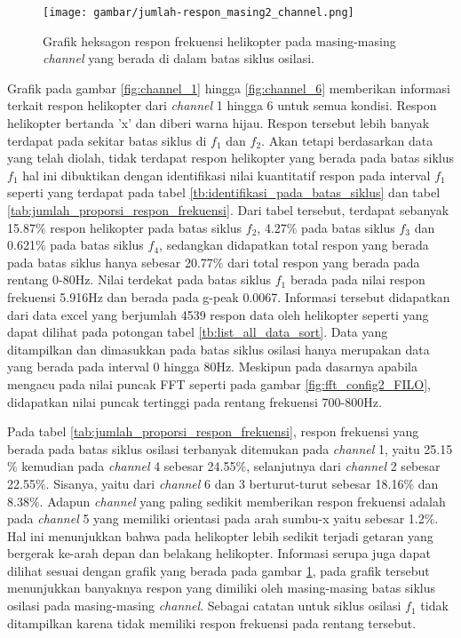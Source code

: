 \begin{figure}[H]
	\centering
	\texttt{[image: gambar/jumlah-respon\_masing2\_channel.png]}
	\caption{Grafik heksagon respon frekuensi helikopter pada masing-masing \textit{channel} yang berada di dalam batas siklus osilasi.}
	\label{fig:grafik_heksagon}
\end{figure}

Grafik pada gambar \ref{fig:channel_1} hingga \ref{fig:channel_6} memberikan informasi terkait respon helikopter dari \textit{channel} 1 hingga 6 untuk semua kondisi. Respon helikopter bertanda 'x' dan diberi warna hijau. Respon tersebut lebih banyak terdapat pada sekitar batas siklus di $f_1$ dan $f_2$. Akan tetapi berdasarkan data yang telah diolah, tidak terdapat respon helikopter yang berada pada batas siklus $f_1$ hal ini dibuktikan dengan identifikasi nilai kuantitatif respon pada interval $f_1$ seperti yang terdapat pada tabel \ref{tb:identifikasi_pada_batas_siklus} dan tabel \ref{tab:jumlah_proporsi_respon_frekuensi}. Dari tabel tersebut, terdapat sebanyak 15.87$\%$ respon helikopter pada batas siklus $f_2$, 4.27$\%$ pada batas siklus $f_3$ dan 0.621$\%$ pada batas siklus $f_4$, sedangkan didapatkan total respon yang berada pada batas siklus hanya sebesar 20.77$\%$ dari total respon yang berada pada rentang 0-80Hz. Nilai terdekat pada batas siklus $f_1$ berada pada nilai respon frekuensi 5.916Hz dan berada pada g-peak 0.0067. Informasi tersebut didapatkan dari data excel yang berjumlah 4539 respon data oleh helikopter seperti yang dapat dilihat pada potongan tabel \ref{tb:list_all_data_sort}. Data yang ditampilkan dan dimasukkan pada batas siklus osilasi hanya merupakan data yang berada pada interval 0 hingga 80Hz. Meskipun pada dasarnya apabila mengacu pada nilai puncak FFT seperti pada gambar \ref{fig:fft_config2_FILO}, didapatkan nilai puncak tertinggi pada rentang frekuensi 700-800Hz.

Pada tabel \ref{tab:jumlah_proporsi_respon_frekuensi}, respon frekuensi yang berada pada batas siklus osilasi terbanyak ditemukan pada \textit{channel} 1, yaitu 25.15$\%$ kemudian pada \textit{channel} 4 sebesar 24.55$\%$, selanjutnya dari \textit{channel} 2 sebesar 22.55$\%$. Sisanya, yaitu dari \textit{channel} 6 dan 3 berturut-turut sebesar 18.16$\%$ dan 8.38$\%$. Adapun \textit{channel} yang paling sedikit memberikan respon frekuensi adalah pada \textit{channel} 5 yang memiliki orientasi pada arah sumbu-x yaitu sebesar 1.2$\%$. Hal ini menunjukkan bahwa pada helikopter lebih sedikit terjadi getaran yang bergerak ke-arah depan dan belakang helikopter. Informasi serupa juga dapat dilihat sesuai dengan grafik yang berada pada gambar \ref{fig:grafik_heksagon}, pada grafik tersebut menunjukkan banyaknya respon yang dimiliki oleh masing-masing batas siklus osilasi pada masing-masing \textit{channel}. Sebagai catatan untuk siklus osilasi $f_1$ tidak ditampilkan karena tidak memiliki respon frekuensi pada rentang tersebut. 

